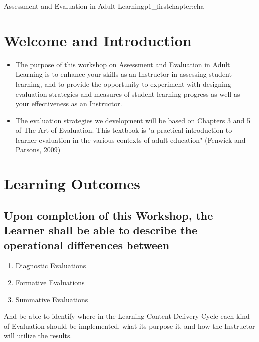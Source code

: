 
\begin{chapterpage}{ Assessment and Evaluation in Adult Learning}{p1_firstchapter:cha}

\end{chapterpage}

\section  {Welcome and Introduction}\label{c1_basicformatting:sec}

\begin{itemize}

\item The purpose of this workshop on Assessment and Evaluation in Adult Learning is to enhance your skills as an Instructor in assessing student learning, and to provide the opportunity to experiment with designing evaluation strategies and measures of student learning progress as well as your effectiveness as an Instructor.

\item The evaluation strategies we development will be based on Chapters 3 and 5 of The Art of Evaluation. This textbook is "a practical introduction to learner evaluation in the various contexts of adult education" (Fenwick and Parsons, 2009)

\end{itemize}

\section {Learning Outcomes}

\subsection {Upon completion of this Workshop, the Learner shall be able to describe the operational differences between }

\begin{enumerate}
	\item Diagnostic Evaluations
	\item Formative Evaluations
	\item Summative Evaluations
\end{enumerate}
And be able to identify where in the Learning Content Delivery Cycle each kind of Evaluation should be implemented, what its purpose it, and how the Instructor will utilize the results.

